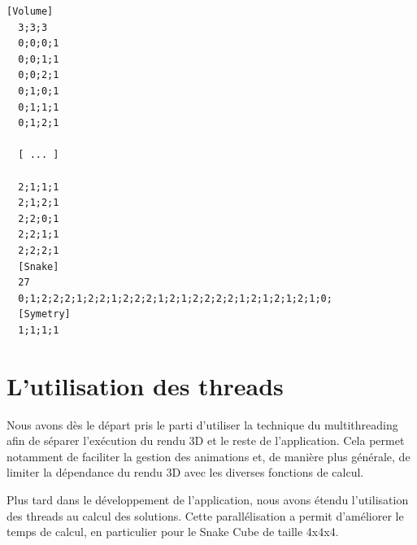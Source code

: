 \newpage
\begin{lstlisting}[caption=Contenu du fichier snake.snake]
 [Volume]
  3;3;3
  0;0;0;1
  0;0;1;1
  0;0;2;1
  0;1;0;1
  0;1;1;1
  0;1;2;1
 
  [ ... ]
 
  2;1;1;1
  2;1;2;1
  2;2;0;1
  2;2;1;1
  2;2;2;1
  [Snake]
  27
  0;1;2;2;2;1;2;2;1;2;2;2;1;2;1;2;2;2;2;1;2;1;2;1;2;1;0;
  [Symetry]
  1;1;1;1
\end{lstlisting}\label{.snake}

\section{L'utilisation des threads}
Nous avons dès le départ pris le parti d'utiliser la technique du multithreading afin de séparer l’exécution du rendu 3D et le reste de l'application. Cela permet notamment de faciliter la gestion des animations et, de manière plus générale, de limiter la dépendance du rendu 3D avec les diverses fonctions de calcul. 

Plus tard dans le développement de l'application, nous avons étendu l'utilisation des threads au calcul des solutions. Cette parallélisation a permit d'améliorer le temps de calcul, en particulier pour le Snake Cube de taille 4x4x4.\newline

